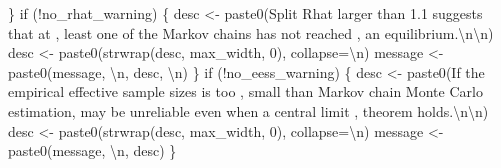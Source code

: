 \documentclass[
  letterpaper,
  DIV=11,
  numbers=noendperiod]{scrartcl}
\newenvironment{Shaded}{\begin{snugshade}}{\end{snugshade}}
\newcommand{\AttributeTok}[1]{\textcolor[rgb]{0.40,0.45,0.13}{#1}}
\newcommand{\ControlFlowTok}[1]{\textcolor[rgb]{0.00,0.23,0.31}{#1}}
\newcommand{\DecValTok}[1]{\textcolor[rgb]{0.68,0.00,0.00}{#1}}
\newcommand{\FunctionTok}[1]{\textcolor[rgb]{0.28,0.35,0.67}{#1}}
\newcommand{\NormalTok}[1]{\textcolor[rgb]{0.00,0.23,0.31}{#1}}
\newcommand{\OtherTok}[1]{\textcolor[rgb]{0.00,0.23,0.31}{#1}}
\newcommand{\SpecialCharTok}[1]{\textcolor[rgb]{0.37,0.37,0.37}{#1}}
\newcommand{\StringTok}[1]{\textcolor[rgb]{0.13,0.47,0.30}{#1}}
\begin{document}
\begin{Shaded}
\begin{Highlighting}[]
\NormalTok{  \}}
  \ControlFlowTok{if}\NormalTok{ (}\SpecialCharTok{!}\NormalTok{no\_rhat\_warning) \{}
\NormalTok{    desc }\OtherTok{\textless{}{-}} \FunctionTok{paste0}\NormalTok{(}\StringTok{\textquotesingle{}Split Rhat larger than 1.1 suggests that at \textquotesingle{}}\NormalTok{,}
                   \StringTok{\textquotesingle{}least one of the Markov chains has not reached \textquotesingle{}}\NormalTok{,}
                   \StringTok{\textquotesingle{}an equilibrium.}\SpecialCharTok{\textbackslash{}n\textbackslash{}n}\StringTok{\textquotesingle{}}\NormalTok{)}
\NormalTok{    desc }\OtherTok{\textless{}{-}} \FunctionTok{paste0}\NormalTok{(}\FunctionTok{strwrap}\NormalTok{(desc, max\_width, }\DecValTok{0}\NormalTok{), }\AttributeTok{collapse=}\StringTok{\textquotesingle{}}\SpecialCharTok{\textbackslash{}n}\StringTok{\textquotesingle{}}\NormalTok{)}
\NormalTok{    message }\OtherTok{\textless{}{-}} \FunctionTok{paste0}\NormalTok{(message, }\StringTok{\textquotesingle{}}\SpecialCharTok{\textbackslash{}n}\StringTok{\textquotesingle{}}\NormalTok{, desc, }\StringTok{\textquotesingle{}}\SpecialCharTok{\textbackslash{}n}\StringTok{\textquotesingle{}}\NormalTok{)}
\NormalTok{  \}}
  \ControlFlowTok{if}\NormalTok{ (}\SpecialCharTok{!}\NormalTok{no\_eess\_warning) \{}
\NormalTok{    desc }\OtherTok{\textless{}{-}} \FunctionTok{paste0}\NormalTok{(}\StringTok{\textquotesingle{}If the empirical effective sample sizes is too \textquotesingle{}}\NormalTok{,}
                   \StringTok{\textquotesingle{}small than Markov chain Monte Carlo estimation\textquotesingle{}}\NormalTok{,}
                   \StringTok{\textquotesingle{}may be unreliable even when a central limit \textquotesingle{}}\NormalTok{,}
                   \StringTok{\textquotesingle{}theorem holds.}\SpecialCharTok{\textbackslash{}n\textbackslash{}n}\StringTok{\textquotesingle{}}\NormalTok{)}
\NormalTok{    desc }\OtherTok{\textless{}{-}} \FunctionTok{paste0}\NormalTok{(}\FunctionTok{strwrap}\NormalTok{(desc, max\_width, }\DecValTok{0}\NormalTok{), }\AttributeTok{collapse=}\StringTok{\textquotesingle{}}\SpecialCharTok{\textbackslash{}n}\StringTok{\textquotesingle{}}\NormalTok{)}
\NormalTok{    message }\OtherTok{\textless{}{-}} \FunctionTok{paste0}\NormalTok{(message, }\StringTok{\textquotesingle{}}\SpecialCharTok{\textbackslash{}n}\StringTok{\textquotesingle{}}\NormalTok{, desc)}
\NormalTok{  \}}


\end{Highlighting}
\end{Shaded}
\end{document}
